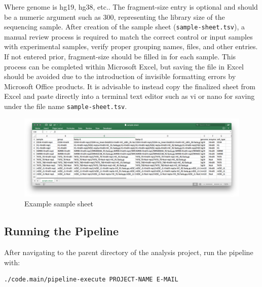 Where genome is hg19, hg38, etc.. The fragment-size entry is optional and should be a numeric argument such as 300, representing the library size of the sequencing sample. After creation of the sample sheet (\texttt{sample-sheet.tsv}), a manual review process is required to match the correct control or input samples with experimental samples, verify proper grouping names, files, and other entries. If not entered prior, fragment-size should be filled in for each sample. This process can be completed within Microsoft Excel, but saving the file in Excel should be avoided due to the introduction of invisible formatting errors by Microsoft Office products. It is advisable to instead copy the finalized sheet from Excel and paste directly into a terminal text editor such as vi or nano for saving under the file name \texttt{sample-sheet.tsv}. 


\begin{figure}[!h]
    \centering
    \includegraphics[width=\textwidth,height=\textheight,keepaspectratio]{figure/sample_sheet_screenshot.png}
    \caption{Example sample sheet}
    \label{fig:label}
\end{figure}

\subsection{Running the Pipeline}\label{Intro:pipeline-execute}
 
After navigating to the parent directory of the analysis project, run the pipeline with:
\begin{lstlisting}
./code.main/pipeline-execute PROJECT-NAME E-MAIL
\end{lstlisting}

\clearpage